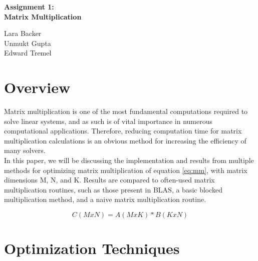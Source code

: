 \documentclass{article}	 %
\begin{document}
\begin{center}
    \Large
    \textbf{Assignment 1: \\ Matrix Multiplication}
    
    \vspace{0.4cm}
    \large
        
    \vspace{0.4cm}
    Lara Backer \\ Unmukt Gupta \\ Edward Tremel

\end{center}


\section{Overview}

Matrix multiplication is one of the most fundamental computations required to solve linear systems, and as such is of vital importance in numerous computational applications. Therefore, reducing computation time for matrix multiplication calculations is an obvious method for increasing the efficiency of many solvers. \\

In this paper, we will be discussing the implementation and results from multiple methods for optimizing matrix multiplication of equation \ref{eq:mm}, with matrix dimensions M, N, and K. Results are compared to often-used matrix multiplication routines, such as those present in BLAS, a basic blocked multiplication method, and a naive matrix multiplication routine. 

\begin{equation}
C (M x N) = A (M x K) * B (K x N)
\label{eq:mm}
\end{equation}


\section{Optimization Techniques}
\end{document}
